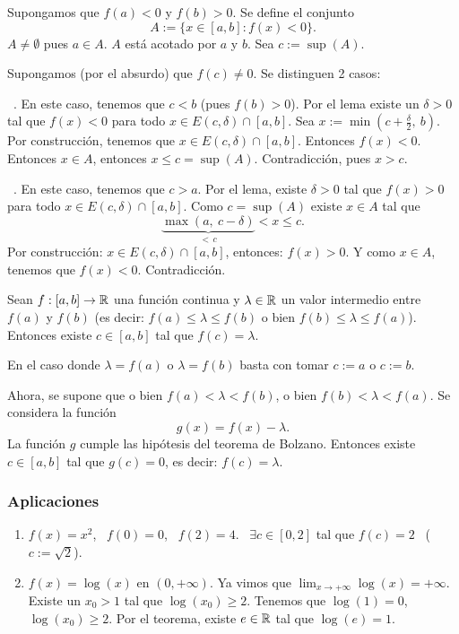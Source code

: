 \documentclass[11pt,a4paper]{article}
\begin{document}
\begin{demo}
Supongamos que $f(a)<0$ y $f(b)>0$. Se define el conjunto
\[
  A:=\{x\in[a,b] : f(x)<0\}.
\]
$A\neq\emptyset$ pues $a\in A$. $A$ está acotado por $a$ y $b$. Sea $c:=\sup(A)$.

Supongamos (por el absurdo) que $f(c)\neq0$. Se distinguen 2 casos:

\ . En este caso, tenemos que $c<b$ (pues $f(b)>0$). Por el lema existe un $\delta>0$ tal que $f(x)<0$ para todo $x\in E(c,\delta)\cap[a,b]$. Sea $x:=\min\left(c+\frac\delta2,\ b\right)$. Por construcción, tenemos que $x\in E(c,\delta)\cap[a,b]$. Entonces $f(x)<0$. Entonces $x\in A$, entonces $x\leq c=\sup(A)$. Contradicción, pues $x>c$.

\ . En este caso, tenemos que $c>a$. Por el lema, existe $\delta>0$ tal que $f(x)>0$ para todo $x\in E(c,\delta)\cap[a,b]$. Como $c=\sup(A)$ existe $x\in A$ tal que
\[
  \underbrace{\max(a,\ c-\delta)}_{<\,c} < x\leq c.
\]
Por construcción: $x\in E(c,\delta)\cap[a,b]$, entonces: $f(x)>0$. Y como $x\in A$, tenemos que $f(x)<0$. Contradicción.
\end{demo}

\begin{corolario}
Sean $f:[a,b]\to\mathbb{R}$ una función continua y $\lambda\in\mathbb{R}$ un valor intermedio entre $f(a)$ y $f(b)$ (es decir: $f(a)\leq\lambda\leq f(b)$ o bien $f(b)\leq\lambda\leq f(a)$). Entonces existe $c\in[a,b]$ tal que $f(c)=\lambda$.
\end{corolario}

\begin{demo}
En el caso donde $\lambda=f(a)$ o $\lambda=f(b)$ basta con tomar $c:=a$ o $c:=b$.

Ahora, se supone que o bien $f(a)<\lambda<f(b)$, o bien $f(b)<\lambda<f(a)$. Se considera la función
\[
  g(x)=f(x)-\lambda.
\]
La función $g$ cumple las hipótesis del teorema de Bolzano. Entonces existe $c\in[a,b]$ tal que $g(c)=0$, es decir: $f(c)=\lambda$.
\end{demo}

\subsubsection*{Aplicaciones}
\begin{enumerate}[label=(\arabic*)]
  \item $f(x)=x^2$, \ $f(0)=0$, \ $f(2)=4$. \ $\exists c\in[0,2]$ tal que $f(c)=2$ \ ($c:=\sqrt2$).
  \item $f(x)=\log(x)$ en $(0,+\infty)$. Ya vimos que $\displaystyle\lim_{x\to+\infty}\log(x)=+\infty$. Existe un $x_0>1$ tal que $\log(x_0)\geq2$. Tenemos que $\log(1)=0$, $\log(x_0)\geq2$. Por el teorema, existe $e\in\mathbb{R}$ tal que $\log(e)=1$.
\end{enumerate}
\end{document}
